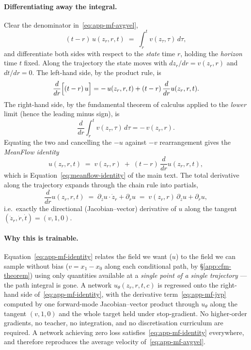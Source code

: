 \paragraph{Differentiating away the integral.} Clear the denominator in~\eqref{eq:app-mf-avgvel},
\begin{equation*}
  (t - r)\, u(z_r, r, t) \;=\; \int_r^t v(z_\tau, \tau)\, d\tau,
\end{equation*}
and differentiate both sides with respect to the \emph{state} time $r$, holding the \emph{horizon} time $t$ fixed. Along the trajectory the state moves with $dz_r/dr = v(z_r, r)$ and $dt/dr = 0$. The left-hand side, by the product rule, is
\begin{equation*}
  \frac{d}{dr}\Bigl[(t - r)\, u\Bigr] = -\,u(z_r, r, t) + (t - r)\,\frac{d}{dr}u(z_r, r, t).
\end{equation*}
The right-hand side, by the fundamental theorem of calculus applied to the \emph{lower} limit (hence the leading minus sign), is
\begin{equation*}
  \frac{d}{dr}\int_r^t v(z_\tau, \tau)\, d\tau = -\,v(z_r, r).
\end{equation*}
Equating the two and cancelling the $-u$ against $-v$ rearrangement gives the \emph{MeanFlow identity}
\begin{equation}
  \boxed{\;u(z_r, r, t) \;=\; v(z_r, r) \;+\; (t - r)\,\frac{d}{dr}u(z_r, r, t),\;}
  \label{eq:app-mf-identity}
\end{equation}
which is Equation~\eqref{eq:meanflow-identity} of the main text. The total derivative along the trajectory expands through the chain rule into partials,
\begin{equation}
  \frac{d}{dr}u(z_r, r, t) \;=\; \partial_z u \cdot \dot z_r + \partial_r u \;=\; v(z_r, r)\,\partial_z u + \partial_r u,
  \label{eq:app-mf-jvp}
\end{equation}
i.e.\ exactly the directional (Jacobian--vector) derivative of $u$ along the tangent $(\dot z_r, \dot r, \dot t) = (v, 1, 0)$.

\paragraph{Why this is trainable.} Equation~\eqref{eq:app-mf-identity} relates the field we want ($u$) to the field we can sample without bias ($v = x_1 - x_0$ along each conditional path, by \S\ref{app:cfm-theorem}) using only quantities available at a \emph{single point of a single trajectory} --- the path integral is gone. A network $u_\theta(z_r, r, t, c)$ is regressed onto the right-hand side of~\eqref{eq:app-mf-identity}, with the derivative term~\eqref{eq:app-mf-jvp} computed by one forward-mode Jacobian--vector product through $u_\theta$ along the tangent $(v, 1, 0)$ and the whole target held under stop-gradient. No higher-order gradients, no teacher, no integration, and no discretisation curriculum are required. A network achieving zero loss satisfies~\eqref{eq:app-mf-identity} everywhere, and therefore reproduces the average velocity of~\eqref{eq:app-mf-avgvel}.

